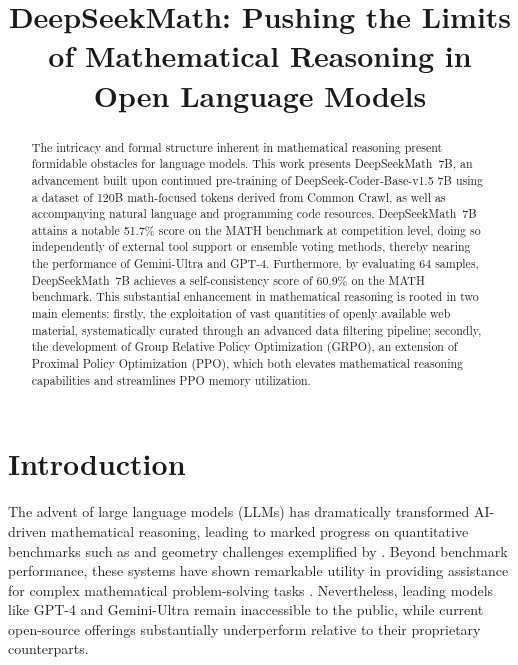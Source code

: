 \title{DeepSeekMath: Pushing the Limits of Mathematical Reasoning in Open Language Models}

\begin{abstract}
The intricacy and formal structure inherent in mathematical reasoning present formidable obstacles for language models. This work presents DeepSeekMath~7B, an advancement built upon continued pre-training of DeepSeek-Coder-Base-v1.5 7B using a dataset of 120B math-focused tokens derived from Common Crawl, as well as accompanying natural language and programming code resources. DeepSeekMath~7B attains a notable 51.7\% score on the MATH benchmark at competition level, doing so independently of external tool support or ensemble voting methods, thereby nearing the performance of Gemini-Ultra and GPT-4. Furthermore, by evaluating 64 samples, DeepSeekMath~7B achieves a self-consistency score of 60.9\% on the MATH benchmark. This substantial enhancement in mathematical reasoning is rooted in two main elements: firstly, the exploitation of vast quantities of openly available web material, systematically curated through an advanced data filtering pipeline; secondly, the development of Group Relative Policy Optimization (GRPO), an extension of Proximal Policy Optimization (PPO), which both elevates mathematical reasoning capabilities and streamlines PPO memory utilization.
\end{abstract}

\section{Introduction}

The advent of large language models (LLMs) has dramatically transformed AI-driven mathematical reasoning, leading to marked progress on quantitative benchmarks such as \citep{MATH} and geometry challenges exemplified by \citep{trinh2024solving}. Beyond benchmark performance, these systems have shown remarkable utility in providing assistance for complex mathematical problem-solving tasks \citep{tao}. Nevertheless, leading models like GPT-4 \citep{gpt4} and Gemini-Ultra \citep{gemini} remain inaccessible to the public, while current open-source offerings substantially underperform relative to their proprietary counterparts.

